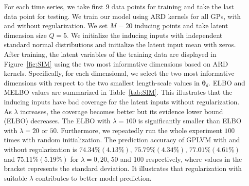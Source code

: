 \documentclass{article}
\begin{document}
For each time series, we take first 9 data points for training and 
take the last data point for testing. We train our model using ARD kernels for all GPs, with and without regularization. We set $M = 20$ inducing points and take latent dimension size $Q = 5$. We initialize the inducing inputs with independent standard normal distributions and initialize the latent input mean with zeros. After training, the latent variables of the training data are displayed in Figure~\ref{fig:SIM} using the two most informative dimensions based on ARD kernels. Specifically, for each dimensional, we select the two most informative dimensions with respect to the two smallest length-scale values in $\bm\theta_d$. ELBO and MELBO values are summarized in Table~\ref{tab:SIM}. This illustrates that the inducing inputs have bad coverage for the latent inputs without regularization. As $\lambda$ increases, the coverage becomes better but its evidence lower bound (ELBO) decreases. The ELBO with $\lambda = 100$ is significantly smaller than ELBO with $\lambda = 20$ or $50$. Furthermore, we repeatedly run the whole experiment $100$ times with random initialization. The prediction accuracy of GPLVM with and without regularization is $74.34\%(4.13\%)$, $75.79\%(4.34\%)$, $77.01\%(4.61\%)$ and $75.11\%(5.19\%)$ for $\lambda = 0, 20$, $50$ and $100$ respectively, where values in the bracket represents the standard deviation. It illustrates that regularization with suitable $\lambda$ contributes to better model prediction. 
\end{document}
